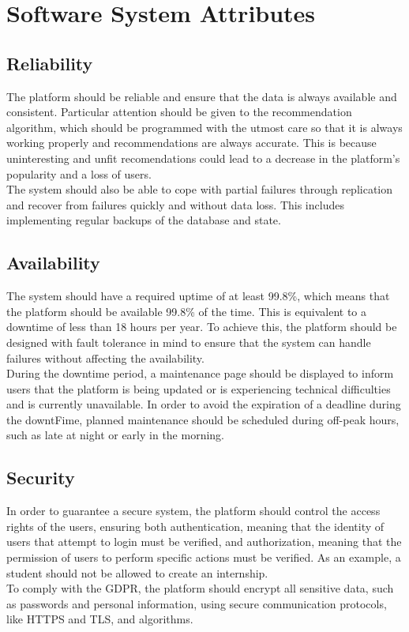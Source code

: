 \section{Software System Attributes}
\subsection{Reliability}
The platform should be reliable and ensure that the data is always available and consistent. Particular attention should be given to the
recommendation algorithm, which should be programmed with the utmost care so that it is always working properly and recommendations are always accurate. 
This is because uninteresting and unfit recomendations could lead to a decrease in the platform's popularity and a loss of users. \\
The system should also be able to cope with partial failures through replication and recover from failures quickly and without data loss. 
This includes implementing regular backups of the database and state.

\subsection{Availability}
The system should have a required uptime of at least 99.8\%, which means that the platform should be available 99.8\% of the time. 
This is equivalent to a downtime of less than 18 hours per year. To achieve this, the platform should be designed with fault tolerance 
in mind to ensure that the system can handle failures without affecting the availability. \\
During the downtime period, a maintenance page should be displayed to inform users that the platform is being updated or is experiencing
technical difficulties and is currently unavailable. In order to avoid the expiration of a deadline during the downtFime, planned maintenance 
should be scheduled during off-peak hours, such as late at night or early in the morning.

\subsection{Security}
In order to guarantee a secure system, the platform should control the access rights of the users, ensuring both authentication, meaning that 
the identity of users that attempt to login must be verified, and authorization, meaning that the permission of users to perform specific actions
must be verified. As an example, a student should not be allowed to create an internship. \\
To comply with the GDPR, the platform should encrypt all sensitive data, such as passwords and personal information, using secure communication protocols, 
like HTTPS and TLS, and algorithms.

